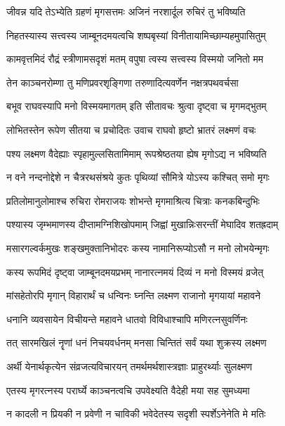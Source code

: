 \twolineshloka
{जीवन्न यदि तेऽभ्येति ग्रहणं मृगसत्तमः}
{अजिनं नरशार्दूल रुचिरं तु भविष्यति} %

\twolineshloka
{निहतस्यास्य सत्त्वस्य जाम्बूनदमयत्वचि}
{शष्पबृस्यां विनीतायामिच्छाम्यहमुपासितुम्} %

\twolineshloka
{कामवृत्तमिदं रौद्रं स्त्रीणामसदृशं मतम्}
{वपुषा त्वस्य सत्त्वस्य विस्मयो जनितो मम} %

\twolineshloka
{तेन काञ्चनरोम्णा तु मणिप्रवरशृङ्गिणा}
{तरुणादित्यवर्णेन नक्षत्रपथवर्चसा} %

\twolineshloka
{बभूव राघवस्यापि मनो विस्मयमागतम्}
{इति सीतावचः श्रुत्वा दृष्ट्वा च मृगमद्भुतम्} %

\twolineshloka
{लोभितस्तेन रूपेण सीतया च प्रचोदितः}
{उवाच राघवो हृष्टो भ्रातरं लक्ष्मणं वचः} %

\twolineshloka
{पश्य लक्ष्मण वैदेह्याः स्पृहामुल्लसितामिमाम्}
{रूपश्रेष्ठतया ह्येष मृगोऽद्य न भविष्यति} %

\twolineshloka
{न वने नन्दनोद्देशे न चैत्ररथसंश्रये}
{कुतः पृथिव्यां सौमित्रे योऽस्य कश्चित् समो मृगः} %

\twolineshloka
{प्रतिलोमानुलोमाश्च रुचिरा रोमराजयः}
{शोभन्ते मृगमाश्रित्य चित्राः कनकबिन्दुभिः} %

\twolineshloka
{पश्यास्य जृम्भमाणस्य दीप्तामग्निशिखोपमाम्}
{जिह्वां मुखान्निःसरन्तीं मेघादिव शतह्रदाम्} %

\twolineshloka
{मसारगल्वर्कमुखः शङ्खमुक्तानिभोदरः}
{कस्य नामानिरूप्योऽसौ न मनो लोभयेन्मृगः} %

\twolineshloka
{कस्य रूपमिदं दृष्ट्वा जाम्बूनदमयप्रभम्}
{नानारत्नमयं दिव्यं न मनो विस्मयं व्रजेत्} %

\twolineshloka
{मांसहेतोरपि मृगान् विहारार्थं च धन्विनः}
{घ्नन्ति लक्ष्मण राजानो मृगयायां महावने} %

\twolineshloka
{धनानि व्यवसायेन विचीयन्ते महावने}
{धातवो विविधाश्चापि मणिरत्नसुवर्णिनः} %

\twolineshloka
{तत् सारमखिलं नॄणां धनं निचयवर्धनम्}
{मनसा चिन्तितं सर्वं यथा शुक्रस्य लक्ष्मण} %

\twolineshloka
{अर्थी येनार्थकृत्येन संव्रजत्यविचारयन्}
{तमर्थमर्थशास्त्रज्ञाः प्राहुरर्थ्याः सुलक्ष्मण} %

\twolineshloka
{एतस्य मृगरत्नस्य परार्घ्ये काञ्चनत्वचि}
{उपवेक्ष्यति वैदेही मया सह सुमध्यमा} %

\twolineshloka
{न कादली न प्रियकी न प्रवेणी न चाविकी}
{भवेदेतस्य सदृशी स्पर्शेऽनेनेति मे मतिः} %


